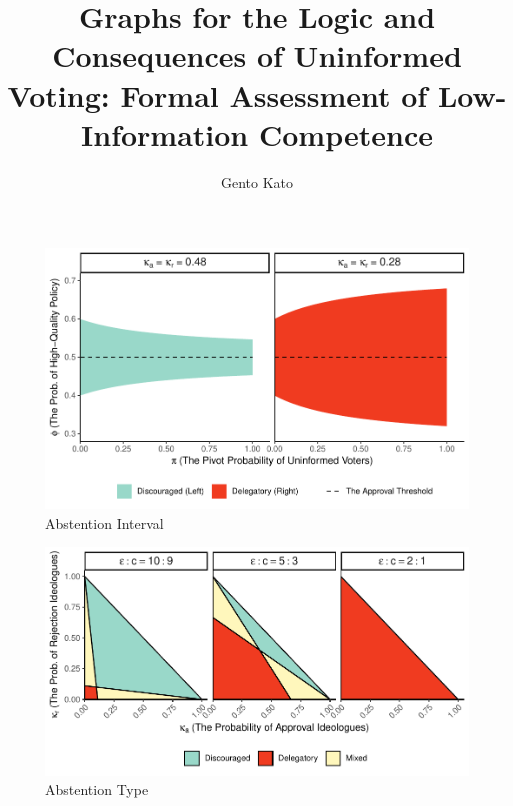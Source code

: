 \documentclass[doc,natbib,12pt]{apa6}\usepackage[]{graphicx}\usepackage[]{color}
\title{Graphs for the Logic and Consequences of Uninformed Voting: Formal Assessment of Low-Information Competence} %
\author{Gento Kato}
\affiliation{University of California, Davis and Waseda University}
\makeatletter
\def\maxwidth{ %
  \ifdim\Gin@nat@width>\linewidth
    \linewidth
  \else
    \Gin@nat@width
  \fi
}
\newenvironment{knitrout}{}{} %
\makeatother
\begin{document}
	\maketitle
	
	
	
\begin{knitrout}
\color{fgcolor}\begin{figure}[h!!!]

{\centering \includegraphics[width=\maxwidth]{figure/abgraph-1} 

}

\caption[Abstention Interval]{Abstention Interval}\label{fig:abgraph}
\end{figure}


\end{knitrout}
	
\begin{knitrout}
\color{fgcolor}\begin{figure}[h!!!]

{\centering \includegraphics[width=\maxwidth]{figure/abtype-1} 

}

\caption[Abstention Type]{Abstention Type}\label{fig:abtype}
\end{figure}


\end{knitrout}
	
\end{document}
